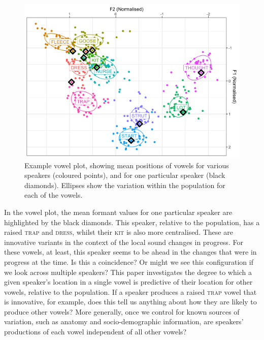 \documentclass[review]{elsarticle} %
\begin{document}
\begin{figure}[!t]
\includegraphics[width=\textwidth]{Figures/examplespeaker2.png}
\caption{Example vowel plot, showing mean positions of vowels for various speakers (coloured points), and for one particular speaker (black diamonds). Ellipses show the variation within the population for each of the vowels.}
\label{fig:speaker_example}
\end{figure}

In the vowel plot, the mean formant values for one particular speaker are highlighted by the black diamonds.  This speaker, relative to the population, has a raised \textsc{trap} and \textsc{dress}, whilst their  \textsc{kit} is also more centralised.   These are innovative variants in the context of the local sound changes in progress.  For these vowels, at least, this speaker seems to be ahead in the changes that were in progress at the time. Is this a coincidence? Or might we see this configuration if we look across multiple speakers? This paper investigates the degree to which a given speaker’s location in a single vowel is predictive of their location for other vowels, relative to the population.   If a speaker produces a raised \textsc{trap} vowel that is innovative, for example, does this tell us anything about how they are likely to produce other vowels?  More generally, once we control for known sources of variation, such as anatomy and socio-demographic information, are speakers’ productions of each vowel independent of all other vowels?
\end{document}
